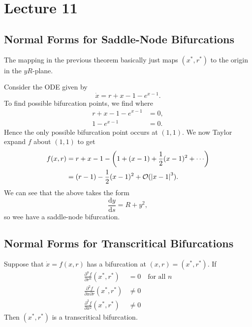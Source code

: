 \documentclass[class=article, crop=false]{standalone}
\begin{document}
  \section{Lecture 11}
  \subsection{Normal Forms for Saddle-Node Bifurcations}
  \begin{note}{}
    The mapping in the previous theorem basically just maps $(x^*, r^*)$ to the origin in the $yR$-plane.
  \end{note}
  \begin{example}{}
    Consider the ODE given by
    \[
      \dot{x} = r + x - 1 - e^{x - 1}.
    \]
    To find possible bifurcation points, we find where
    \begin{align*}
      r + x - 1 - e^{x - 1} &= 0, \\
      1 - e^{x - 1} &= 0.
    \end{align*}
    Hence the only possible bifurcation point occurs at $(1, 1)$. We now Taylor expand $f$ about $(1, 1)$ to get
    \begin{align*}
      f(x, r) &= r + x - 1 - \paren{1 + (x - 1) + \frac{1}{2}(x - 1)^2 + \dotsb} \\
              &= (r - 1) - \frac{1}{2}(x - 1)^2 + \mathcal{O}(\abs{x - 1}^3).
    \end{align*}
    We can see that the above takes the form
    \[
      \frac{\mathrm{d}y}{\mathrm{d}s} = R + y^2,
    \]
    so wee have a saddle-node bifurcation.
  \end{example}
  \subsection{Normal Forms for Transcritical Bifurcations}
  \begin{theorem}{}
    Suppose that $\dot{x} = f(x, r)$ has a bifurcation at $(x, r) = (x^*, r^*)$. If 
    \begin{align*}
      \frac{\partial^nf}{\partial r^n}(x^*, r^*) &= 0\quad\text{for all }n \\
      \frac{\partial^2f}{\partial x\partial r}(x^*, r^*) &\neq 0 \\
      \frac{\partial^2f}{\partial x^2}(x^*, r^*) &\neq 0
    \end{align*}
    Then $(x^*, r^*)$ is a transcritical bifurcation. 
  \end{theorem}
\end{document}
